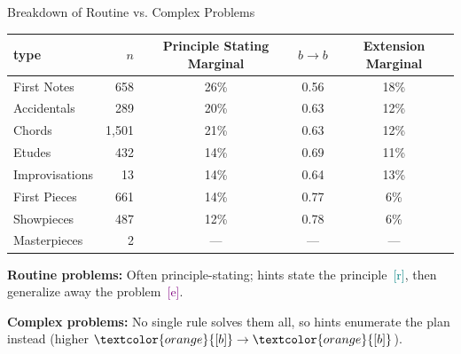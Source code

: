\documentclass[10pt,aspectratio=169]{beamer}
\newcommand{\hr}{\textcolor{teal}{[r]}}
\newcommand{\hb}{\textcolor{orange}{[b]}}
\newcommand{\he}{\textcolor{purple}{[e]}}
\begin{document}
\begin{frame}{Breakdown of Routine vs. Complex Problems}
  \begin{table} 
    \centering 
    \small
    \begin{tabular}{lrccc}
      \toprule
      type & $n$ & Principle Stating Marginal & $b\to b$ & Extension Marginal \\
      \midrule
      First Notes & 658   & 26\% & 0.56 & 18\% \\
      Accidentals & 289   & 20\% & 0.63 & 12\%  \\
      Chords & 1{,}501 & 21\% & 0.63 & 12\%  \\
      Etudes & 432   & 14\% & 0.69 & 11\%  \\
      \midrule
      Improvisations & 13    & 14\% & 0.64 & 13\%  \\
      First Pieces & 661   & 14\% & 0.77 & 6\%  \\
      Showpieces & 487   & 12\% & 0.78 & 6\%  \\
      Masterpieces & 2     & --- & ---  & ---  \\
      \bottomrule
    \end{tabular}
    
    \vspace{0.75em} %
    
    \begin{minipage}{0.95\textwidth}
      \footnotesize %
      \textbf{Routine problems:} Often principle-stating; hints state the principle~\hr, then generalize away the problem~\he. 
      
      \vspace{0.3em}
        
      \textbf{Complex problems:} No single rule solves them all, so hints enumerate the plan instead (higher $\hb\to\hb$). 
    \end{minipage}
  \end{table} 
\end{frame}
\end{document}
